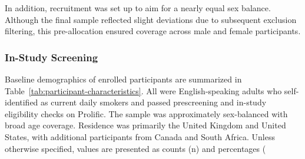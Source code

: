 In addition, recruitment was set up to aim for a nearly equal sex balance. Although the final sample reflected slight deviations due to subsequent exclusion filtering, this pre-allocation ensured coverage across male and female participants.

\subsubsection{In-Study Screening}

\noindent Baseline demographics of enrolled participants are summarized in Table~\ref{tab:participant-characteristics}. All were English-speaking adults who self-identified as current daily smokers and passed prescreening and in-study eligibility checks on Prolific. The sample was approximately sex-balanced with broad age coverage. Residence was primarily the United Kingdom and United States, with additional participants from Canada and South Africa. Unless otherwise specified, values are presented as counts (n) and percentages (%

